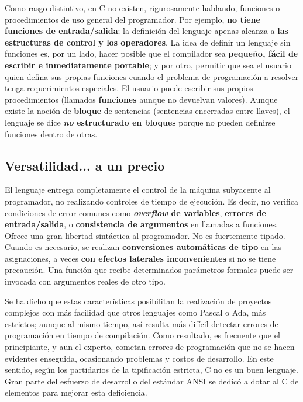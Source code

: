 Como rasgo
distintivo, en C no existen, rigurosamente hablando, funciones o
procedimientos de uso general del programador. Por ejemplo, \textbf{no tiene
funciones de entrada/salida}; la definición del lenguaje apenas
alcanza a \textbf{las estructuras de control y los operadores}. La idea de
definir un lenguaje sin funciones es, por un lado, hacer posible que el
compilador sea \textbf{pequeño, fácil de escribir e inmediatamente
portable}; y por otro, permitir que sea el usuario quien defina sus
propias funciones cuando el problema de programación a resolver tenga
requerimientos especiales. El usuario puede escribir sus propios procedimientos (llamados
\textbf{funciones} aunque no devuelvan valores). Aunque existe la
noción de \textbf{bloque} de sentencias (sentencias encerradas entre llaves), el lenguaje se dice \textbf{\textit{no}
estructurado en bloques} porque no pueden definirse funciones dentro de
otras. 

\subsection{Versatilidad... a un precio}
El lenguaje entrega completamente el control de la máquina subyacente
al programador, no realizando controles de tiempo de ejecución. Es
decir, no verifica condiciones de error comunes como \textbf{\textit{overflow}
de variables}, \textbf{errores de entrada/salida}, o \textbf{consistencia de argumentos}
en llamadas a funciones. Ofrece una gran libertad sintáctica al programador. No
es fuertemente tipado. Cuando es necesario, se realizan \textbf{conversiones
automáticas de tipo} en las asignaciones, a veces \textbf{con efectos
laterales inconvenientes} si no se tiene precaución. Una función que
recibe determinados parámetros formales puede ser invocada con
argumentos reales de otro tipo. 

Se ha dicho que estas características
 posibilitan la realización de
proyectos complejos con más facilidad que otros lenguajes como Pascal
o Ada, más estrictos; aunque al mismo tiempo, así resulta más
difícil detectar errores de programación en tiempo de
compilación. Como resultado, es frecuente que el
principiante, y aun el experto, cometan errores de programación que
no se hacen evidentes enseguida, ocasionando problemas y costos de
desarrollo. En este sentido, según los partidarios de la
tipificación estricta, C no es un buen lenguaje. Gran parte del
esfuerzo de desarrollo del estándar ANSI se dedicó a dotar al C de
elementos para mejorar esta deficiencia. 

